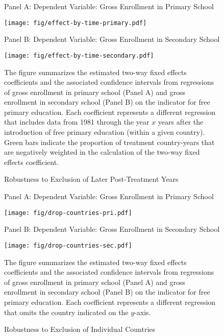 \documentclass[11pt]{article}
\begin{document}
\begin{figure}[h]
	\begin{center}	
		\caption{Robustness to Exclusion of Later Post-Treatment Years} \label{fig:droptime}
		
		\medskip		
		\medskip
		
		Panel A:  Dependent Variable:  Gross Enrollment in Primary School
		
		\texttt{[image: fig/effect-by-time-primary.pdf]}
		
		\medskip
		
		Panel B:  Dependent Variable:  Gross Enrollment in Secondary School
		
		\texttt{[image: fig/effect-by-time-secondary.pdf]}
		
	\end{center}

\footnotesize{The figure summarizes the estimated two-way fixed effects coefficients and the associated confidence intervals from regressions of gross enrollment in primary school (Panel A) and gross enrollment in secondary school (Panel B) on the indicator for free primary education.  Each coefficient represents a different regression that includes data from 1981 through the year $x$ years after the introduction of free primary education (within a given country).  Green bars indicate the proportion of treatment country-years that are negatively weighted in the calculation of the two-way fixed effects coefficient.}
\end{figure}


\clearpage

\begin{figure}[h]
	\begin{center}	
		\caption{Robustness to Exclusion of Individual Countries} \label{fig:dropcountries}
		
		\medskip		
		\medskip
		
		Panel A:  Dependent Variable:  Gross Enrollment in Primary School
		
		\texttt{[image: fig/drop-countries-pri.pdf]}
		
		\medskip
		
		Panel B:  Dependent Variable:  Gross Enrollment in Secondary School
		
		\texttt{[image: fig/drop-countries-sec.pdf]}
		
	\end{center}

\footnotesize{The figure summarizes the estimated two-way fixed effects coefficients and the associated confidence intervals from regressions of gross enrollment in primary school (Panel A) and gross enrollment in secondary school (Panel B) on the indicator for free primary education.  Each coefficient represents a different regression that omits the country indicated on the $y$-axis.}

\end{figure}
\end{document}
